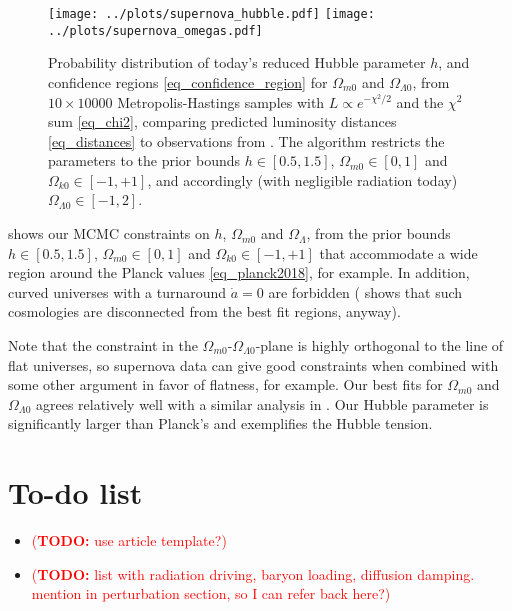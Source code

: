\documentclass[10pt,a4paper]{article}
\newcommand\TODO[1]{\textcolor{red}{(\textbf{TODO:} #1)}}
\begin{document}
\begin{figure}[bh!]
	\centering
	\texttt{[image: ../plots/supernova\_hubble.pdf]}
	\texttt{[image: ../plots/supernova\_omegas.pdf]}
	\caption{%
		Probability distribution of today's reduced Hubble parameter $h$,
		and confidence regions \eqref{eq_confidence_region} for $\Omega_{m0}$ and $\Omega_{\Lambda0}$,
		from $10 \times 10000$ Metropolis-Hastings samples with $L \propto e^{-\chi^2/2}$ and the $\chi^2$ sum \eqref{eq_chi2},
		comparing predicted luminosity distances \eqref{eq_distances} to observations from \cite{betouleImprovedCosmologicalConstraints2014}.
		The algorithm restricts the parameters to the prior bounds $h \in [0.5, 1.5]$, $\Omega_{m0} \in [0, 1]$ and $\Omega_{k0} \in [-1, +1]$, and accordingly (with negligible radiation today) $\Omega_{\Lambda0} \in [-1, 2]$.
	}
	\label{fig_supernova_mcmc}
\end{figure}

 shows our MCMC constraints on $h$, $\Omega_{m0}$ and $\Omega_\Lambda$,
from the prior bounds $h \in [0.5, 1.5]$, $\Omega_{m0} \in [0, 1]$ and $\Omega_{k0} \in [-1, +1]$
that accommodate a wide region around the Planck values \eqref{eq_planck2018}, for example.
In addition, curved universes with a turnaround $\dot{a} = 0$ are forbidden
(\cite[Figure 11]{amanullahSpectraLightCurves2010} shows that such cosmologies are disconnected from the best fit regions, anyway).

Note that the constraint in the $\Omega_{m0}$-$\Omega_{\Lambda0}$-plane is highly orthogonal to the line of flat universes,
so supernova data can give good constraints when combined with some other argument in favor of flatness, for example.
Our best fits for $\Omega_{m0}$ and $\Omega_{\Lambda0}$ agrees relatively well with a similar analysis in \cite[Fig. 15]{betouleImprovedCosmologicalConstraints2014}.
Our Hubble parameter is significantly larger than Planck's and exemplifies the Hubble tension.

\clearpage

\section{To-do list}

\begin{itemize}
\item \TODO{use article template?}

\item \TODO{list with radiation driving, baryon loading, diffusion damping. mention in perturbation section, so I can refer back here?}
\end{itemize}

\clearpage
%
\printbibliography
\end{document}
